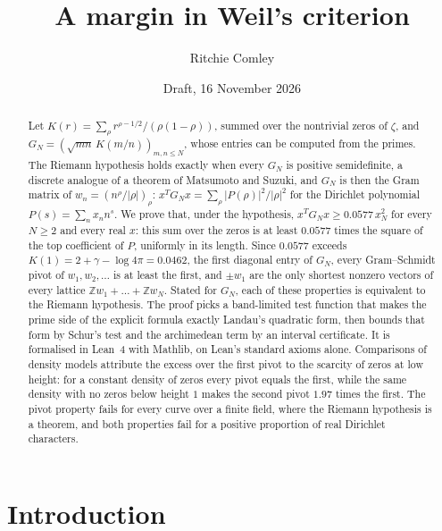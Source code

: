 \documentclass[11pt]{article}
\title{A margin in Weil's criterion}
\author{Ritchie Comley}
\date{Draft, 16 November 2026}
\theoremstyle{definition}
\newcommand{\KH}{K}
\begin{document}
\maketitle

\begin{abstract}
Let $\KH(r) = \sum_\rho r^{\rho - 1/2}/(\rho(1 - \rho))$, summed over the nontrivial zeros of $\zeta$, and $G_N =
(\sqrt{mn}\,\KH(m/n))_{m, n \le N}$, whose entries can be computed from the primes. The Riemann hypothesis holds exactly
when every $G_N$ is positive semidefinite, a discrete analogue
of a theorem of Matsumoto and Suzuki, and $G_N$ is then the
Gram matrix of $w_n = (n^\rho/|\rho|)_\rho$: $x^T G_N x = \sum_\rho |P(\rho)|^2/|\rho|^2$ for the Dirichlet polynomial
$P(s) = \sum_n x_n n^s$. We prove that, under the hypothesis, $x^T G_N x \ge 0.0577\,x_N^2$ for every $N \ge 2$ and
every real $x$: this sum over the zeros is at least $0.0577$
times the square of the top coefficient of $P$, uniformly in its
length. Since $0.0577$ exceeds $\KH(1) = 2 + \gamma - \log 4\pi = 0.0462$, the first diagonal entry of $G_N$, every
Gram--Schmidt pivot of $w_1, w_2, \dots$ is at least the first, and $\pm w_1$ are the only shortest nonzero vectors of
every lattice $\mathbb Z w_1 + \dots
+ \mathbb Z w_N$. Stated for $G_N$, each of these properties is equivalent to the Riemann hypothesis. The proof picks a
band-limited test function that makes the prime side of the explicit formula exactly Landau's quadratic form, then
bounds that form by Schur's test and the archimedean term by an interval certificate. It is formalised in Lean~4 with
Mathlib, on Lean's standard axioms alone. Comparisons of density models attribute the excess over the first pivot to
the scarcity of zeros at low height: for a constant density of zeros every pivot equals the first, while the same
density with no zeros below height $1$ makes the second pivot
$1.97$ times the first. The pivot property fails for every curve
over a finite field, where the Riemann hypothesis is a theorem, and both properties fail for a positive proportion of
real Dirichlet characters.
\end{abstract}

\section{Introduction}\label{sec:intro}
\end{document}

